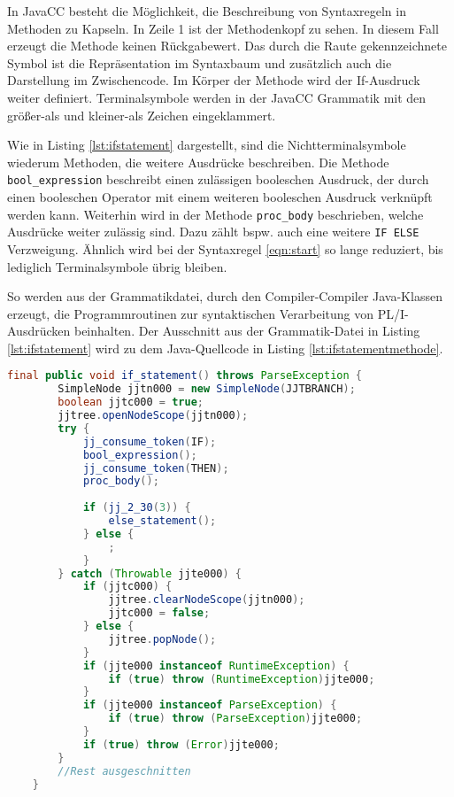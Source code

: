 In JavaCC besteht die Möglichkeit, die Beschreibung von Syntaxregeln in Methoden zu Kapseln.
In Zeile 1 ist der Methodenkopf zu sehen. In diesem Fall erzeugt die Methode keinen Rückgabewert.
Das durch die Raute gekennzeichnete Symbol ist die Repräsentation im Syntaxbaum und zusätzlich auch die Darstellung im Zwischencode.
Im Körper der Methode wird der If-Ausdruck weiter definiert. Terminalsymbole werden in der JavaCC Grammatik mit den größer-als und kleiner-als Zeichen eingeklammert. 

Wie in Listing \ref{lst:ifstatement} dargestellt, sind die Nichtterminalsymbole wiederum Methoden, die  weitere Ausdrücke beschreiben. Die Methode \verb+bool_expression+ beschreibt einen zulässigen booleschen Ausdruck, der durch einen booleschen Operator mit einem weiteren booleschen Ausdruck verknüpft werden kann. Weiterhin wird in der Methode \verb+proc_body+ beschrieben, welche Ausdrücke weiter zulässig sind. Dazu zählt bspw. auch eine weitere \verb+IF ELSE+ Verzweigung. Ähnlich wird bei der Syntaxregel \ref{eqn:start} so lange reduziert, bis lediglich Terminalsymbole übrig bleiben.

So werden aus der Grammatikdatei, durch den Compiler-Compiler Java-Klassen erzeugt, die Programmroutinen zur syntaktischen Verarbeitung von PL/I-Ausdrücken beinhalten.
Der Ausschnitt aus der Grammatik-Datei in Listing \ref{lst:ifstatement} wird zu dem Java-Quellcode in Listing \ref{lst:ifstatementmethode}.
\pagebreak

\begin{lstlisting}[language=Java, caption=Syntaxregel für Verzweigungen als Java-Methode, label={lst:ifstatementmethode}]
	final public void if_statement() throws ParseException {
		SimpleNode jjtn000 = new SimpleNode(JJTBRANCH);
		boolean jjtc000 = true;
		jjtree.openNodeScope(jjtn000);
		try {
			jj_consume_token(IF);
			bool_expression();
			jj_consume_token(THEN);
			proc_body();
			
			if (jj_2_30(3)) {
				else_statement();
			} else {
				;
			}
		} catch (Throwable jjte000) {
			if (jjtc000) {
				jjtree.clearNodeScope(jjtn000);
				jjtc000 = false;
			} else {
				jjtree.popNode();
			}
			if (jjte000 instanceof RuntimeException) {
				if (true) throw (RuntimeException)jjte000;
			}
			if (jjte000 instanceof ParseException) {
				if (true) throw (ParseException)jjte000;
			}
			if (true) throw (Error)jjte000;
		}
		//Rest ausgeschnitten
	}	
\end{lstlisting}

